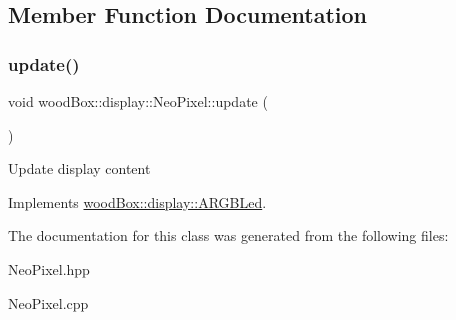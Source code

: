 \subsection{Member Function Documentation}
\mbox{\label{classwood_box_1_1display_1_1_neo_pixel_ac2ec48825a10154e0ef99c4d8010aa6e}} 
\subsubsection{\texorpdfstring{update()}{update()}}
{\footnotesize\ttfamily void wood\+Box\+::display\+::\+Neo\+Pixel\+::update (\begin{DoxyParamCaption}{ }\end{DoxyParamCaption})\hspace{0.3cm}{\ttfamily [virtual]}}

Update display content 

Implements \mbox{\hyperlink{classwood_box_1_1display_1_1_a_r_g_b_led_ab71f321d91e931f95b96d1f492a9454d}{wood\+Box\+::display\+::\+A\+R\+G\+B\+Led}}.



The documentation for this class was generated from the following files\+:\begin{DoxyCompactItemize}
\item 
Neo\+Pixel.\+hpp\item 
Neo\+Pixel.\+cpp\end{DoxyCompactItemize}
